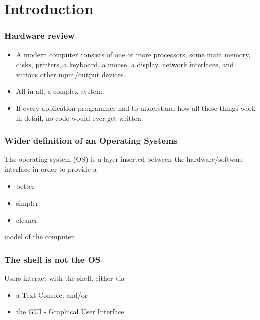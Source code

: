 \section{Introduction}

\begin{frame}
    \frametitle{Hardware review}
    
    \begin{itemize}
        \item 
        A modern  computer  consists  of  one  or  more
        processors, some main  memory, disks,  printers,  
        a  keyboard,  a  mouse, a  display,  
        network  interfaces,  and  various other 
        input/output devices.

        \item 
        All in all, a complex system.
        
        \item 
        If every application programmer had to understand
        how all these things work in detail,
        no code would ever get written.

    \end{itemize}    

\end{frame}

\begin{frame}
    \frametitle{Wider definition of an Operating Systems}
    
    The operating system (OS) is a layer inserted 
    between the hardware/software interface in order
    to provide a 
    \begin{itemize}
        \item better
        \item simpler
        \item cleaner
    \end{itemize} 
    model of the computer.

\end{frame}

\begin{frame}
    \frametitle{The shell is not the OS}
    
    Users interact with the shell, either via 
    \begin{itemize}
        \item a Text Console; and/or
        \item the GUI - Graphical User Interface.
    \end{itemize}

\end{frame}


